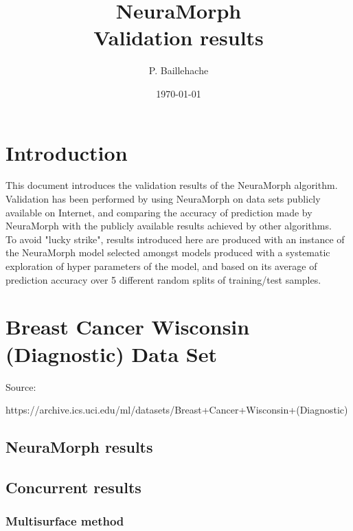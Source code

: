 \documentclass[8pt, a4paper]{article}
\begin{document}
\title{NeuraMorph\\Validation results}
\author{P. Baillehache}
\date{\today}
\maketitle

\tableofcontents

\section*{Introduction}

This document introduces the validation results of the NeuraMorph algorithm.\\

Validation has been performed by using NeuraMorph on data sets publicly available on Internet, and comparing the accuracy of prediction made by NeuraMorph with the publicly available results achieved by other algorithms.\\

To avoid "lucky strike", results introduced here are produced with an instance of the NeuraMorph model selected amongst models produced with a systematic exploration of hyper parameters of the model, and based on its average of prediction accuracy over 5 different random splits of training/test samples.\\

\section{Breast Cancer Wisconsin (Diagnostic) Data Set}

Source: 

https://archive.ics.uci.edu/ml/datasets/Breast+Cancer+Wisconsin+(Diagnostic)

\subsection{NeuraMorph results}



\subsection{Concurrent results}

\subsubsection{Multisurface method}
\end{document}
